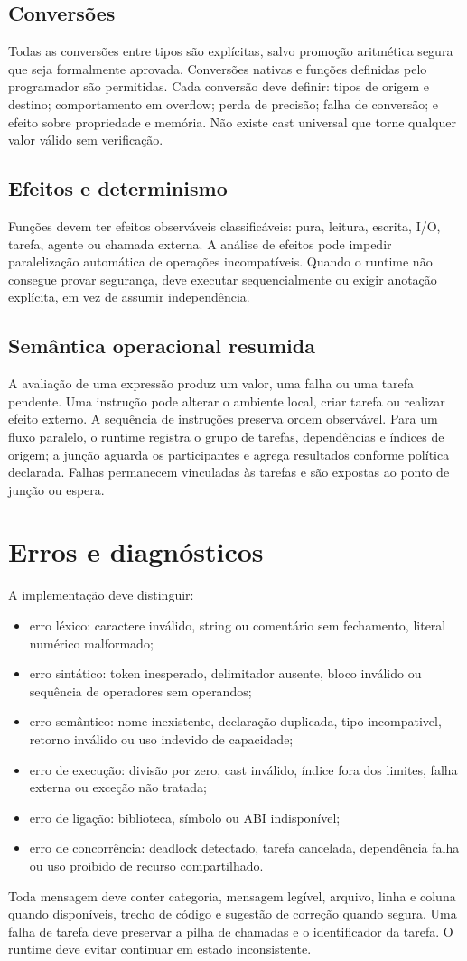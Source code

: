 \documentclass[12pt,a4paper]{article}
\begin{document}
\subsection{Conversões}
Todas as conversões entre tipos são explícitas, salvo promoção aritmética segura que seja formalmente aprovada. Conversões nativas e funções definidas pelo programador são permitidas. Cada conversão deve definir: tipos de origem e destino; comportamento em overflow; perda de precisão; falha de conversão; e efeito sobre propriedade e memória. Não existe cast universal que torne qualquer valor válido sem verificação.
\subsection{Efeitos e determinismo}
Funções devem ter efeitos observáveis classificáveis: pura, leitura, escrita, I/O, tarefa, agente ou chamada externa. A análise de efeitos pode impedir paralelização automática de operações incompatíveis. Quando o runtime não consegue provar segurança, deve executar sequencialmente ou exigir anotação explícita, em vez de assumir independência.
\subsection{Semântica operacional resumida}
A avaliação de uma expressão produz um valor, uma falha ou uma tarefa pendente. Uma instrução pode alterar o ambiente local, criar tarefa ou realizar efeito externo. A sequência de instruções preserva ordem observável. Para um fluxo paralelo, o runtime registra o grupo de tarefas, dependências e índices de origem; a junção aguarda os participantes e agrega resultados conforme política declarada. Falhas permanecem vinculadas às tarefas e são expostas ao ponto de junção ou espera.
\section{Erros e diagnósticos}
A implementação deve distinguir:
\begin{itemize}
\item erro léxico: caractere inválido, string ou comentário sem fechamento, literal numérico malformado;
\item erro sintático: token inesperado, delimitador ausente, bloco inválido ou sequência de operadores sem operandos;
\item erro semântico: nome inexistente, declaração duplicada, tipo incompativel, retorno inválido ou uso indevido de capacidade;
\item erro de execução: divisão por zero, cast inválido, índice fora dos limites, falha externa ou exceção não tratada;
\item erro de ligação: biblioteca, símbolo ou ABI indisponível;
\item erro de concorrência: deadlock detectado, tarefa cancelada, dependência falha ou uso proibido de recurso compartilhado.
\end{itemize}
Toda mensagem deve conter categoria, mensagem legível, arquivo, linha e coluna quando disponíveis, trecho de código e sugestão de correção quando segura. Uma falha de tarefa deve preservar a pilha de chamadas e o identificador da tarefa. O runtime deve evitar continuar em estado inconsistente.
\end{document}
